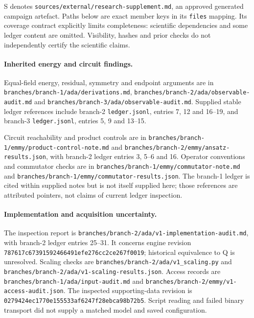 \documentclass{article}
\begin{document}
S denotes \texttt{sources/external/research-supplement.md}, an approved generated campaign artefact. Paths below are exact member keys in its \texttt{files} mapping. Its coverage contract explicitly limits completeness: scientific dependencies and some ledger content are omitted. Visibility, hashes and prior checks do not independently certify the scientific claims.

\paragraph{Inherited energy and circuit findings.}
Equal-field energy, residual, symmetry and endpoint arguments are in \texttt{branches/branch-1/ada/derivations.md}, \texttt{branches/branch-2/ada/observable-audit.md} and \texttt{branches/branch-3/ada/observable-audit.md}. Supplied stable ledger references include branch-2 \texttt{ledger.jsonl}, entries 7, 12 and 16--19, and branch-3 \texttt{ledger.jsonl}, entries 5, 9 and 13--15.

Circuit reachability and product controls are in \texttt{branches/branch-1/emmy/product-control-note.md} and \texttt{branches/branch-2/emmy/ansatz-results.json}, with branch-2 ledger entries 3, 5--6 and 16. Operator conventions and commutator checks are in \texttt{branches/branch-1/emmy/commutator-note.md} and \texttt{branches/branch-1/emmy/commutator-results.json}. The branch-1 ledger is cited within supplied notes but is not itself supplied here; those references are attributed pointers, not claims of current ledger inspection.

\paragraph{Implementation and acquisition uncertainty.}
The inspection report is \texttt{branches/branch-2/ada/v1-implementation-audit.md}, with branch-2 ledger entries 25--31. It concerns engine revision \texttt{787617c67391592466491efe276cc2ce267f0019}; historical equivalence to Q is unresolved. Scaling checks are \texttt{branches/branch-2/ada/v1\_scaling.py} and \texttt{branches/branch-2/ada/v1-scaling-results.json}. Access records are \texttt{branches/branch-1/ada/input-audit.md} and \texttt{branches/branch-2/emmy/v1-access-audit.json}. The inspected supporting-data revision is \texttt{0279424ec1770e155533af6247f28ebca98b72b5}. Script reading and failed binary transport did not supply a matched model and saved configuration.
\end{document}
